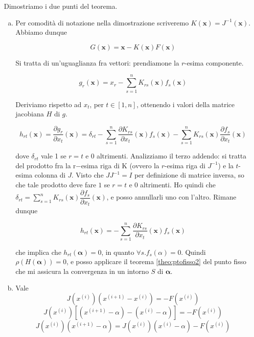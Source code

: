 \begin{thproof}
Dimostriamo i due punti del teorema.

\begin{enumerate}[(a)]
\item Per comodit\`a di notazione nella dimostrazione scriveremo $
  K(\mathbf{x}) = J^{-1}(\mathbf{x}) $. Abbiamo dunque

\[ G(\mathbf{x}) = \mathbf{x} - K(\mathbf{x})F(\mathbf{x}) \]

Si tratta di un'uguaglianza fra vettori: prendiamone la $r$-esima
componente.

\[ g_r(\mathbf{x}) = x_r - \sum_{s=1}^{n}K_{rs}(\mathbf{x})f_{s}(\mathbf{x}) \]

Deriviamo rispetto ad $ x_t $, per $ t \in [1,n] $, ottenendo i valori
della matrice jacobiana $H$ di $g$.

\[ h_{rt}(\mathbf{x}) = \dfrac{\partial g_r}{\partial x_t}(\mathbf{x}) =
\delta_{rt} - \sum_{s=1}^{n} \dfrac{\partial K_{rs}}{\partial x_t}(\mathbf{x})
f_s(\mathbf{x}) - \sum_{s=1}^{n} K_{rs}(\mathbf{x}) \dfrac{\partial f_s}{\partial
  x_t}(\mathbf{x})\]

dove $ \delta_{rt} $ vale 1 se $ r=t $ e $0$ altrimenti. Analizziamo il
terzo addendo: si tratta del prodotto fra la r$-$esima riga di K (ovvero
la $r$-esima riga di $ J^{-1} $) e la $t$-esima colonna di $J$. Visto che $
JJ^{-1} = I $ per definizione di matrice inversa, so che tale prodotto
deve fare $1$ se $ r=t $ e $0$ altrimenti. Ho quindi che $ \delta_{rt} =
\displaystyle \sum_{s=1}^{n} K_{rs}(\mathbf{x}) \dfrac{\partial f_s}{\partial x_t}(\mathbf{x})$, e
posso annullarli uno con l'altro. Rimane dunque

\[ h_{rt}(\mathbf{x}) = - \sum_{s=1}^{n} \dfrac{\partial K_{rs}}{\partial x_t}(\mathbf{x}) f_s(\mathbf{x}) \]

che implica che $ h_{rt}(\mathbf{\alpha}) = 0 $, in quanto $ \forall
s.f_s(\alpha) = 0 $. Quindi $ \rho (H(\mathbf{\alpha})) = 0 $, e posso
applicare il teorema \ref{theo:ptofisso2} del punto fisso che mi
assicura la convergenza in un intorno $S$ di $ \mathbf{\alpha} $.
\item Vale
\[ J(x^{(i)})(x^{(i+1)} - x^{(i)}) = - F(x^{(i)}) \]
\[ J(x^{(i)})\left[ (x^{(i+1)} - \alpha) - (x^{(i)} - \alpha) \right] = - F(x^{(i)}) \]
\begin{equation} 
J(x^{(i)}) (x^{(i+1)} - \alpha) = J(x^{(i)}) (x^{(i)} - \alpha) -
F(x^{(i)})
\label{eqn:newtrhap1}\end{equation}


\end{enumerate}
\end{thproof}
